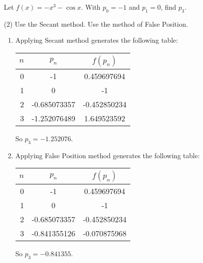 \documentclass[../../../../Assignments]{subfiles}
\begin{document}
\begin{exercise}
    Let \(f(x) = -x^3 - \cos{x}\). With \(p_0 = -1\) and \(p_1 = 0\), find
    \(p_3\).

    \begin{tasks}(2)
        \task Use the Secant method.
        \task Use the method of False Position.
    \end{tasks}
\end{exercise}

\begin{solution}
    \begin{enumerate}[label = \alph*)]
        \item Applying Secant method generates the following table:

            \begin{table}[H]
                \centering
                \begin{tabular}{r S[table-format=-1.9] S[table-format=-1.9]}
                    \toprule
                    \(n\)  &    {\(p_n\)}   &  {\(f(p_n)\)}  \\
                      &  -1            &   0.459697694  \\
                        1  &   0            &  -1            \\
                        2  &  -0.685073357  &  -0.452850234  \\
                        3  &  -1.252076489  &   1.649523592  \\
                    \bottomrule
                \end{tabular}
            \end{table}

            So \(p_3 = \num{-1.252076}\).

        \item Applying False Position method generates the following table:

            \begin{table}[H]
                \centering
                \begin{tabular}{r S[table-format=-1.9] S[table-format=-1.9]}
                    \toprule
                    \(n\)  &    {\(p_n\)}   &  {\(f(p_n)\)}  \\
                      &  -1            &   0.459697694  \\
                        1  &   0            &  -1            \\
                        2  &  -0.685073357  &  -0.452850234  \\
                        3  &  -0.841355126  &  -0.070875968  \\
                    \bottomrule
                \end{tabular}
            \end{table}

            So \(p_3 = \num{-0.841355}\).

    \end{enumerate}
\end{solution}
\end{document}
